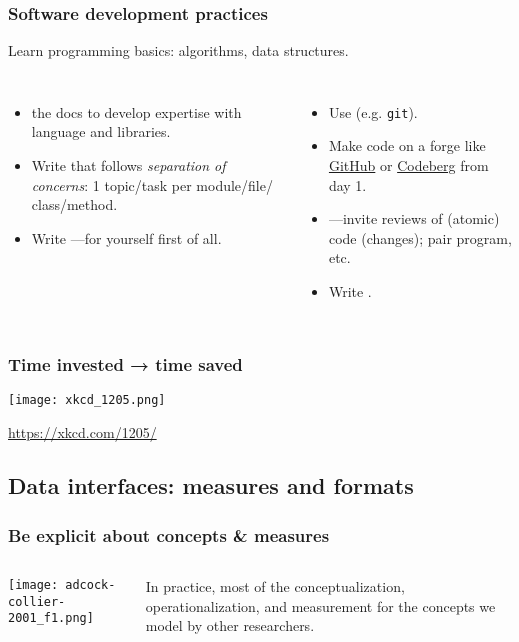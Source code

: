 \documentclass[12pt,aspectratio=169]{beamer}
\begin{document}
\begin{frame}
\frametitle{Software development practices}

Learn programming basics: algorithms, data structures.

\begin{columns}

\begin{itemize}
  \item {} the docs to develop expertise with language and libraries.
  \item Write  that follows \emph{separation of concerns}: 1 topic/task per module/file/ class/method.
  \item Write —for yourself first of all.
\end{itemize}

\begin{itemize}
  \item Use  (e.g. \texttt{git}).
  \item Make code  on a forge like \href{https://github.com}{GitHub} or \href{https://codeberg.org}{Codeberg} from day 1.
  \item {}—invite reviews of (atomic) code (changes); pair program, etc.
  \item Write .
\end{itemize}
\end{columns}

\end{frame}

\begin{frame}
\frametitle{Time invested → time saved}

\centering
\texttt{[image: xkcd\_1205.png]}

\url{https://xkcd.com/1205/}

\end{frame}

\subsection{Data interfaces: measures and formats}

\begin{frame}
\frametitle{Be explicit about concepts \& measures}

\begin{columns}
\column{0.5\paperwidth}
\texttt{[image: adcock-collier-2001\_f1.png]}

\column{0.4\paperwidth}
{\small {}}

\medskip
In practice, most of the conceptualization, operationalization, and measurement for the concepts we model  by other researchers.
\end{columns}
\end{frame}
\end{document}
